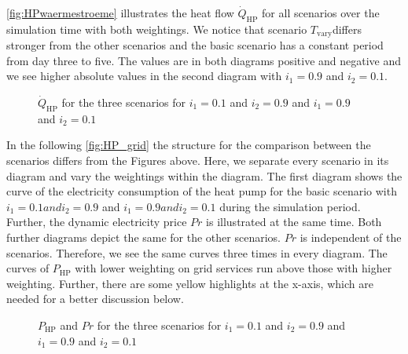 \autoref{fig:HPwaermestroeme} illustrates the heat flow $\dot{Q}_\text{HP}$ for all scenarios over the simulation time with both weightings. We notice that scenario $T_\text{vary}$differs stronger from the other scenarios and the basic scenario has a constant period from day three to five. The values are in both diagrams positive and negative and we see higher absolute values in the second diagram with $i_\text{1} = 0.9$ and $i_\text{2} = 0.1$.

    \begin{figure}[H]
           \centering
        \def\svgwidth{1.01\textwidth}
        
        \caption{$\dot{Q}_\text{HP}$ for the three scenarios for $i_\text{1} = 0.1$ and $i_\text{2} = 0.9$ and $i_\text{1} = 0.9$ and $i_\text{2} = 0.1$}
         \label{fig:HPwaermestroeme}
    \end{figure}
    
In the following \autoref{fig:HP_grid} the structure for the comparison between the scenarios differs from the Figures above. Here, we separate every scenario in its diagram and vary the weightings within the diagram. The first diagram shows the curve of the electricity consumption of the heat pump for the basic scenario with $i_\text{1} = 0.1 and i_\text{2} = 0.9$ and $i_\text{1} = 0.9 and i_\text{2} = 0.1$ during the simulation period. Further, the dynamic electricity price $Pr$ is illustrated at the same time. Both further diagrams depict the same for the other scenarios. $Pr$ is independent of the scenarios. Therefore, we see the same curves three times in every diagram. The curves of $P_\text{HP}$ with lower weighting on grid services run above those with higher weighting. Further, there are some yellow highlights at the x-axis, which are needed for a better discussion below. 
    \begin{figure}[H]
           \centering
        \def\svgwidth{1.05\textwidth}
        
        \caption{$P_\text{HP}$ and $Pr$ for the three scenarios for $i_\text{1} = 0.1$ and $i_\text{2} = 0.9$ and $i_\text{1} = 0.9$ and $i_\text{2} = 0.1$}
         \label{fig:HP_grid}
    \end{figure}
    
